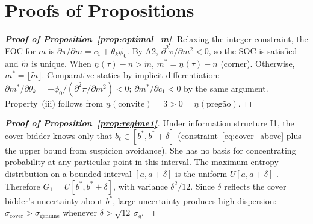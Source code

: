 
\section{Proofs of Propositions}\label{app:proofs}

\begin{proof}[\textbf{Proof of Proposition~\ref{prop:optimal_m}}]
Relaxing the integer constraint, the FOC for $m$ is
$\partial \pi / \partial m = c_1 + \theta_k \phi_0$.
By A2, $\partial^2 \pi / \partial m^2 < 0$, so the SOC is satisfied
and $\tilde{m}$ is unique. When $\underline{n}(\tau) - n > \tilde{m}$,
$m^* = \underline{n}(\tau) - n$ (corner). Otherwise,
$m^* = \lfloor \tilde{m} \rfloor$.
Comparative statics by implicit differentiation:
$\partial m^* / \partial \theta_k =
-\phi_0 / (\partial^2 \pi / \partial m^2) < 0$;
$\partial m^* / \partial c_1 < 0$ by the same argument.
Property~(iii) follows from $\underline{n}(\text{convite}) = 3 >
0 = \underline{n}(\text{preg\~ao})$.
\end{proof}

\begin{proof}[\textbf{Proof of Proposition~\ref{prop:regime1}}]
Under information structure I1, the cover bidder knows only that
$b_\ell \in [b^*, b^* + \delta]$ (constraint~\eqref{eq:cover_above}
plus the upper bound from suspicion avoidance). She has no basis
for concentrating probability at any particular point in this
interval. The maximum-entropy distribution on a bounded interval
$[a, a + \delta]$ is the uniform $U[a, a + \delta]$
\citep[see, e.g.,][Ch.~12]{jaynes2003probability}. Therefore
$G_1 = U[b^*, b^* + \delta]$, with variance $\delta^2/12$.
Since $\delta$ reflects the cover bidder's uncertainty about
$b^*$, large uncertainty produces high dispersion:
$\sigma_{\text{cover}} > \sigma_{\text{genuine}}$ whenever
$\delta > \sqrt{12}\,\sigma_g$.
\end{proof}

